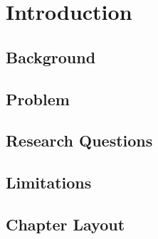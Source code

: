 \documentclass[12pt, a4, twoside, openright]{book}
\begin{document}
    \renewcommand{\thepage}{\roman{page}}
    \frontmatterDSV %
    
    \tableofcontents
    
    \listoftables
    \listoffigures
    
    
    \chapter{Introduction}
    \label{chap:introduction}
    
    \renewcommand{\thepage}{\arabic{page}}    
    \setcounter{page}{1}
    
    \section{Background}
    \label{sec:background}    
    

    \section{Problem}
    \label{sec:problem}    
    
    
%    
        
    \section{Research Questions}
    \label{sec:resq}
    
    
    \section{Limitations}
    \label{sec:limit}
    
    
    \section{Chapter Layout}
    \label{sec:layout}
    
    
    
\end{document}
